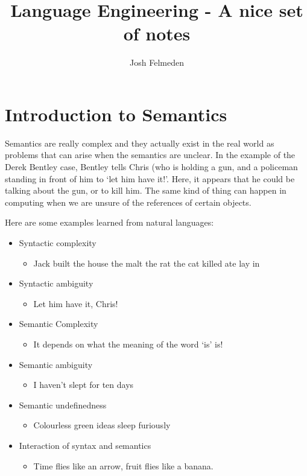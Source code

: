 \documentclass[11pt,a4paper,headsepline,titlepage,dvipsnames,cmyk]{scrartcl}
\title{Language Engineering - A nice set of notes}
\author{Josh Felmeden}
\begin{document}
\maketitle
\tableofcontents

\newpage

\section{Introduction to Semantics}%
\label{sec:intro-semantics}

Semantics are really complex and they actually exist in the real world as
problems that can arise when the semantics are unclear. In the example of
the Derek Bentley case, Bentley tells Chris (who is holding a gun, and a
policeman standing in front of him to `let him have it!'. Here, it
appears that he could be talking about the gun, or to kill him. The same
kind of thing can happen in computing when we are unsure of the references
of certain objects. 

Here are some examples learned from natural languages:
\begin{itemize}
    \item Syntactic complexity
        \begin{itemize}
            \item Jack built the house the malt the rat the cat killed ate
                lay in
        \end{itemize}
    \item Syntactic ambiguity
        \begin{itemize}
            \item Let him have it, Chris!
        \end{itemize}
        \item Semantic Complexity
            \begin{itemize}
                \item It depends on what the meaning of the word `is' is!
            \end{itemize}
        \item Semantic ambiguity
            \begin{itemize}
                \item I haven't slept for ten days
            \end{itemize}
            \item Semantic undefinedness
            \begin{itemize}
                \item Colourless green ideas sleep furiously
            \end{itemize}
            \item Interaction of syntax and semantics
                \begin{itemize}
                    \item Time flies like an arrow, fruit flies like a
                        banana.
                \end{itemize}
\end{itemize}
\end{document}
